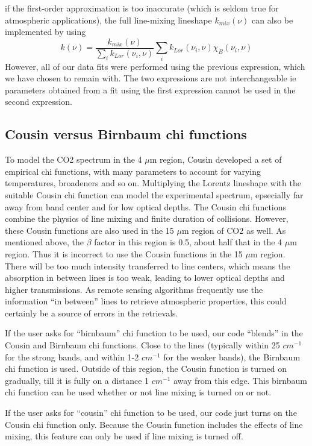 \documentclass[11pt]{article}
\begin{document}
if the first-order approximation is too inaccurate (which is seldom true 
for atmospheric applications), the full line-mixing lineshape 
$k_{mix}(\nu)$ can also be implemented by using 
\[
k(\nu)=\frac{k_{mix}(\nu)}{\sum_i k_{Lor}(\nu_i,\nu)}
\sum_i k_{Lor}(\nu_i,\nu)\chi_B(\nu_i,\nu)
\]
However, all of our data fits were performed using the previous expression, 
which we have chosen to remain with. The two expressions are not 
interchangeable ie parameters obtained from a fit using the first expression 
cannot be used in the second expression.

\subsection{Cousin versus Birnbaum chi functions}
To model the CO2 spectrum in the 4 $\mu$m region, Cousin developed a set of
empirical chi functions, with many parameters to account for varying
temperatures, broadeners and so on. Multiplying the Lorentz lineshape
with the suitable Cousin chi function can model the experimental spectrum,
epsecially far away from band center and for low optical depths. The Cousin
chi functions combine the physics of line mixing and finite duration of 
collisions. However, these Cousin functions are also used in the 15 $\mu$m
region of CO2 as well. As mentioned above, the $\beta$ factor in this region
is 0.5, about half that in the 4 $\mu$m region. Thus it is incorrect to use
the Cousin functions in the 15 $\mu$m region. There will be too much 
intensity transferred to line centers, which means the absorption in 
between lines is too weak, leading to lower optical depths and higher 
transmissions. As remote sensing algorithms frequently use the information
``in between'' lines to retrieve atmospheric properties, this could 
certainly be a source of errors in the retrievals.

If the user asks for ``birnbaum'' chi function to be used, our code 
``blends'' in the Cousin and Birnbaum chi functions. Close to the 
lines (typically within 25 $cm^{-1}$ for the strong bands, and 
within 1-2 $cm^{-1}$ for the weaker bands), the Birnbaum chi function is 
used. Outside of this region, the Cousin function is turned on gradually, 
till it is fully on a distance 1 $cm^{-1}$ away from this edge. This 
birnbaum chi function can be used whether or not line mixing is turned 
on or not.

If the user asks for ``cousin'' chi function to be used, our code just 
turns on the Cousin chi function only. Because the Cousin function includes
the effects of line mixing, this feature can only be used if line mixing is 
turned off.
\end{document}
